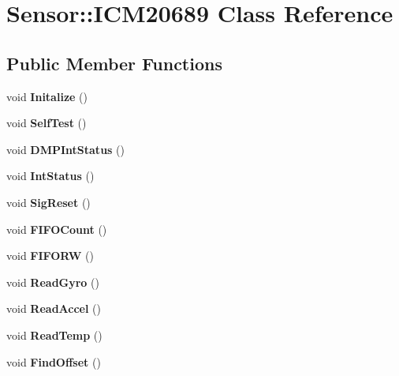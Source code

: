 \hypertarget{classSensor_1_1ICM20689}{}\section{Sensor\+::I\+C\+M20689 Class Reference}
\label{classSensor_1_1ICM20689}
\subsection*{Public Member Functions}
\begin{DoxyCompactItemize}
\item 
\mbox{\label{classSensor_1_1ICM20689_a90e6f7dfc54f0ef3ee7fc1e6b0b18b7b}} 
void {\bfseries Initalize} ()
\item 
\mbox{\label{classSensor_1_1ICM20689_a55a7d6deda2dc5f9a1e00c858247e914}} 
void {\bfseries Self\+Test} ()
\item 
\mbox{\label{classSensor_1_1ICM20689_abd8af511e7e1432cbc1e70f57b53b78e}} 
void {\bfseries D\+M\+P\+Int\+Status} ()
\item 
\mbox{\label{classSensor_1_1ICM20689_a0ba60845100ba43d604dadef5c8d1d50}} 
void {\bfseries Int\+Status} ()
\item 
\mbox{\label{classSensor_1_1ICM20689_ad9b051814387c3fe2eddd12bd0296cc8}} 
void {\bfseries Sig\+Reset} ()
\item 
\mbox{\label{classSensor_1_1ICM20689_a66566e68a5fd0076c7f4b5d3132087e3}} 
void {\bfseries F\+I\+F\+O\+Count} ()
\item 
\mbox{\label{classSensor_1_1ICM20689_ad61f9c2618a6093a61112de0088d8256}} 
void {\bfseries F\+I\+F\+O\+RW} ()
\item 
\mbox{\label{classSensor_1_1ICM20689_a3a7b53316fa068aed70a6d5302ef8374}} 
void {\bfseries Read\+Gyro} ()
\item 
\mbox{\label{classSensor_1_1ICM20689_a7b796f6241abe75cf5770996c2ab924d}} 
void {\bfseries Read\+Accel} ()
\item 
\mbox{\label{classSensor_1_1ICM20689_a195881ce5745637091b8ea07cac993be}} 
void {\bfseries Read\+Temp} ()
\item 
\mbox{\label{classSensor_1_1ICM20689_a36eedfde3208c98ddde584a1553febe1}} 
void {\bfseries Find\+Offset} ()
\end{DoxyCompactItemize}
